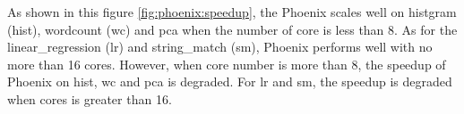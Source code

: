 As shown in this figure \ref{fig:phoenix:speedup}, 
the Phoenix scales well on histgram (hist), wordcount (wc) and pca when the number of core is less than 8.
As for the linear\_regression (lr) and string\_match (sm), 
Phoenix performs well with no more than 16 cores.
However, when core number is more than  8, 
the speedup of Phoenix  on hist,  wc and pca is degraded.
For lr and sm, the speedup is degraded when cores is greater than 16.
